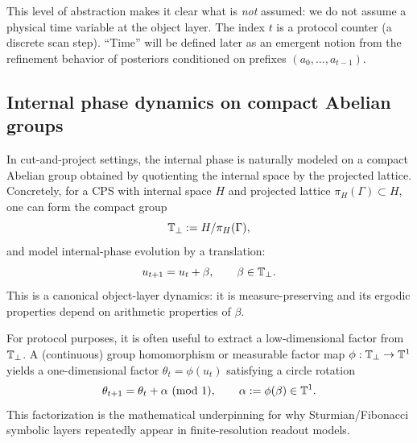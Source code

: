 This level of abstraction makes it clear what is \emph{not} assumed: we do not assume a physical time variable at the object layer. The index $t$ is a protocol counter (a discrete scan step). ``Time'' will be defined later as an emergent notion from the refinement behavior of posteriors conditioned on prefixes $(a_0,\dots,a_{t-1})$.

\subsection{Internal phase dynamics on compact Abelian groups}\label{sec:readout:internal-phase}

In cut-and-project settings, the internal phase is naturally modeled on a compact Abelian group obtained by quotienting the internal space by the projected lattice. Concretely, for a CPS with internal space $H$ and projected lattice $\pi_H(\Gamma)\subset H$, one can form the compact group
\[
\mathbb{T}_\perp := H / \pi_H(\Gamma),
\]
and model internal-phase evolution by a translation:
\[
u_{t+1}=u_t+\beta,\qquad \beta\in \mathbb{T}_\perp.
\]
This is a canonical object-layer dynamics: it is measure-preserving and its ergodic properties depend on arithmetic properties of $\beta$.

For protocol purposes, it is often useful to extract a low-dimensional factor from $\mathbb{T}_\perp$. A (continuous) group homomorphism or measurable factor map $\phi:\mathbb{T}_\perp\to\mathbb{T}^1$ yields a one-dimensional factor $\theta_t=\phi(u_t)$ satisfying a circle rotation
\[
\theta_{t+1}=\theta_t+\alpha\ (\mathrm{mod}\ 1),
\qquad \alpha:=\phi(\beta)\in\mathbb{T}^1.
\]
This factorization is the mathematical underpinning for why Sturmian/Fibonacci symbolic layers repeatedly appear in finite-resolution readout models.

